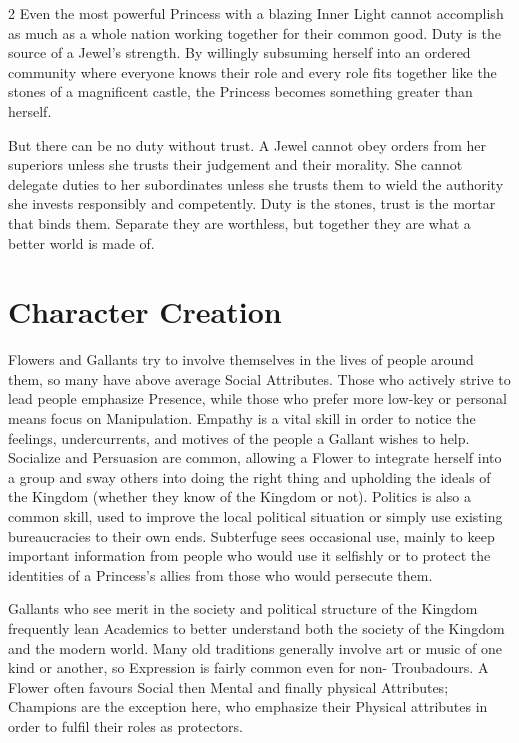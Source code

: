 \begin{multicols}{2}
Even the most powerful Princess with a blazing Inner Light cannot accomplish as much as a whole nation working together for their common good. Duty is the source of a Jewel's strength. By willingly subsuming herself into an ordered community where everyone knows their role and every role fits together like the stones of a magnificent castle, the Princess becomes something greater than herself. 

But there can be no duty without trust. A Jewel cannot obey orders from her superiors unless she trusts their judgement and their morality. She cannot delegate duties to her subordinates unless she trusts them to wield the authority she invests responsibly and competently. Duty is the stones, trust is the mortar that binds them. Separate they are worthless, but together they are what a better world is made of.

\section*{Character Creation}
Flowers and Gallants try to involve themselves in the lives of people around them, so many have above average Social Attributes. Those who actively strive to lead people emphasize Presence, while those who prefer more low-key or personal means focus on Manipulation. Empathy is a vital skill in order to notice the feelings, undercurrents, and motives of the people a Gallant wishes to help. Socialize and Persuasion are common, allowing a Flower to integrate herself into a group and sway others into doing the right thing and upholding the ideals of the Kingdom (whether they know of the Kingdom or not). Politics is also a common skill, used to improve the local political situation or simply use existing bureaucracies to their own ends. Subterfuge sees occasional use, mainly to keep important information from people who would use it selfishly or to protect the identities of a Princess's allies from those who would persecute them. 

Gallants who see merit in the society and political structure of the Kingdom frequently lean Academics to better understand both the society of the Kingdom and the modern world. Many old traditions generally involve art or music of one kind or another, so Expression is fairly common even for non- Troubadours. A Flower often favours Social then Mental and finally physical Attributes; Champions are the exception here, who emphasize their Physical attributes in order to fulfil their roles as protectors.


\end{multicols}
